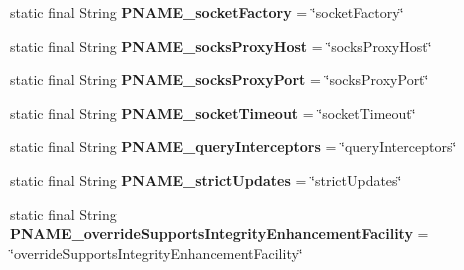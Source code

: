 \begin{DoxyCompactItemize}
\item 
\mbox{\label{classcom_1_1mysql_1_1cj_1_1conf_1_1_property_definitions_a04db99acec79f982d83d20dd766a7dc4}} 
static final String {\bfseries P\+N\+A\+M\+E\+\_\+socket\+Factory} = \char`\"{}socket\+Factory\char`\"{}
\item 
\mbox{\label{classcom_1_1mysql_1_1cj_1_1conf_1_1_property_definitions_aee6b14bb9da0b62ca684d46a4f477067}} 
static final String {\bfseries P\+N\+A\+M\+E\+\_\+socks\+Proxy\+Host} = \char`\"{}socks\+Proxy\+Host\char`\"{}
\item 
\mbox{\label{classcom_1_1mysql_1_1cj_1_1conf_1_1_property_definitions_ac9626df9025368ed3eaaae8bfde4d915}} 
static final String {\bfseries P\+N\+A\+M\+E\+\_\+socks\+Proxy\+Port} = \char`\"{}socks\+Proxy\+Port\char`\"{}
\item 
\mbox{\label{classcom_1_1mysql_1_1cj_1_1conf_1_1_property_definitions_a944af4a86c59171d65778610717e9b31}} 
static final String {\bfseries P\+N\+A\+M\+E\+\_\+socket\+Timeout} = \char`\"{}socket\+Timeout\char`\"{}
\item 
\mbox{\label{classcom_1_1mysql_1_1cj_1_1conf_1_1_property_definitions_a5b4a9bb8cb74fb15dc42cacea128dfc1}} 
static final String {\bfseries P\+N\+A\+M\+E\+\_\+query\+Interceptors} = \char`\"{}query\+Interceptors\char`\"{}
\item 
\mbox{\label{classcom_1_1mysql_1_1cj_1_1conf_1_1_property_definitions_af33911aaf8321e862198f5e76b6ee1cc}} 
static final String {\bfseries P\+N\+A\+M\+E\+\_\+strict\+Updates} = \char`\"{}strict\+Updates\char`\"{}
\item 
\mbox{\label{classcom_1_1mysql_1_1cj_1_1conf_1_1_property_definitions_a9e7a5e5eac89335ca6007b3c66ba8a99}} 
static final String {\bfseries P\+N\+A\+M\+E\+\_\+override\+Supports\+Integrity\+Enhancement\+Facility} = \char`\"{}override\+Supports\+Integrity\+Enhancement\+Facility\char`\"{}

\end{DoxyCompactItemize}
